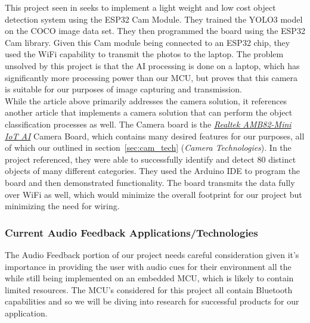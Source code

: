 \noindent This project seen in \cite{ESP32CamRef1} seeks to implement a light weight and low cost object detection system using the ESP32 Cam Module. They trained the YOLO3 model on the COCO image data set. They then programmed the board using the ESP32 Cam library. Given this Cam module being connected to an ESP32 chip, they used the WiFi capability to transmit the photos to the laptop. The problem unsolved by this project is that the AI processing is done on a laptop, which has significantly more processing power than our MCU, but proves that this camera is suitable for our purposes of image capturing and transmission. \\

\noindent While the article above primarily addresses the camera solution, it references another article \cite{RealTekCamRef1} that implements a camera solution that can perform the object classification processes as well. The Camera board is the \underline{\textit{Realtek AMB82-Mini IoT AI}} Camera Board, which contains many desired features for our purposes, all of which our outlined in section~\ref{sec:cam_tech} (\textit{Camera Technologies}). In the project referenced, they were able to successfully identify and detect 80 distinct objects of many different categories. They used the Arduino IDE to program the board and then demonstrated functionality. The board transmits the data fully over WiFi as well, which would minimize the overall footprint for our project but minimizing the need for wiring.\\


\subsubsection{Current Audio Feedback Applications/Technologies}
\noindent The Audio Feedback portion of our project needs careful consideration given it's importance in providing the user with audio cues for their environment all the while still being implemented on an embedded MCU, which is likely to contain limited resources. The MCU's considered for this project all contain Bluetooth capabilities and so we will be diving into research for successful products for our application. \\


